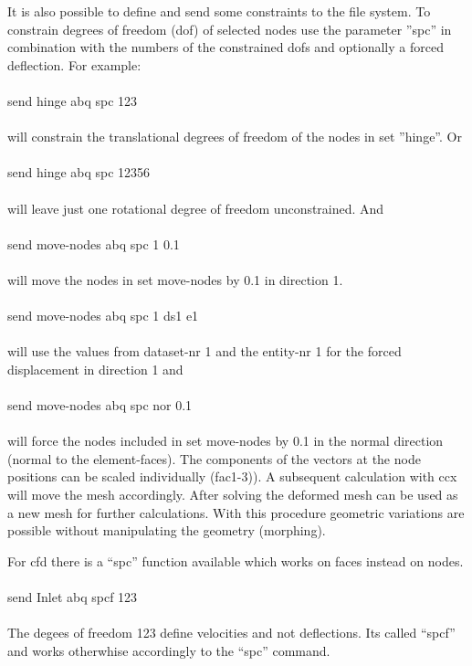 \documentclass{article}
\begin{document}
It is also possible to define and send some constraints to the file system. To constrain degrees of freedom (dof) of selected nodes use the parameter ''spc'' in combination with the numbers of the constrained dofs and optionally a forced deflection. For example:\\\\send hinge abq spc 123\\\\will constrain the translational degrees of freedom of the nodes in set ''hinge''. Or\\\\send hinge abq spc 12356\\\\will leave just one rotational degree of freedom unconstrained. And\\\\send move-nodes abq spc 1 0.1\\\\will move the nodes in set move-nodes by 0.1 in direction 1.\\\\send move-nodes abq spc 1 ds1 e1\\\\will use the values from dataset-nr 1 and the entity-nr 1 for the forced displacement in direction 1 and\\\\send move-nodes abq spc nor 0.1\\\\ will force the nodes included in set move-nodes by 0.1 in the normal direction (normal to the element-faces). The components of the vectors at the node positions can be scaled individually (fac1-3)). A subsequent calculation with ccx will move the mesh accordingly. After solving the deformed mesh can be used as a new mesh for further calculations. With this procedure geometric variations are possible without manipulating the geometry (morphing).

For cfd there is a ``spc'' function available which works on faces instead on nodes.\\\\send Inlet abq spcf 123\\\\The degees of freedom 123 define velocities and not deflections. Its called ``spcf'' and works otherwhise accordingly to the ``spc'' command.
\end{document}
